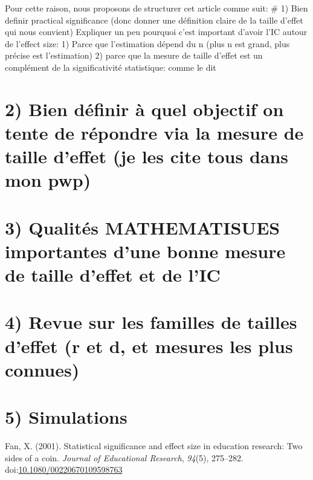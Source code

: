 \documentclass[man]{apa6}
\begin{document}
Pour cette raison, nous proposons de structurer cet article comme suit:
\# 1) Bien definir practical significance (donc donner une définition claire de la taille d'effet qui nous convient)
Expliquer un peu pourquoi c'est important d'avoir l'IC autour de l'effect size:
1) Parce que l'estimation dépend du n (plus n est grand, plus précise est l'estimation)
2) parce que la mesure de taille d'effet est un complément de la significativité statistique: comme le dit

\hypertarget{bien-duxe9finir-uxe0-quel-objectif-on-tente-de-ruxe9pondre-via-la-mesure-de-taille-deffet-je-les-cite-tous-dans-mon-pwp}{%
\section{2) Bien définir à quel objectif on tente de répondre via la mesure de taille d'effet (je les cite tous dans mon pwp)}\label{bien-duxe9finir-uxe0-quel-objectif-on-tente-de-ruxe9pondre-via-la-mesure-de-taille-deffet-je-les-cite-tous-dans-mon-pwp}}

\hypertarget{qualituxe9s-mathematisues-importantes-dune-bonne-mesure-de-taille-deffet-et-de-lic}{%
\section{3) Qualités MATHEMATISUES importantes d'une bonne mesure de taille d'effet et de l'IC}\label{qualituxe9s-mathematisues-importantes-dune-bonne-mesure-de-taille-deffet-et-de-lic}}

\hypertarget{revue-sur-les-familles-de-tailles-deffet-r-et-d-et-mesures-les-plus-connues}{%
\section{4) Revue sur les familles de tailles d'effet (r et d, et mesures les plus connues)}\label{revue-sur-les-familles-de-tailles-deffet-r-et-d-et-mesures-les-plus-connues}}

\hypertarget{simulations}{%
\section*{5) Simulations}\label{simulations}}

\hypertarget{refs}{}
\leavevmode\hypertarget{ref-Fan_2001}{}%
Fan, X. (2001). Statistical significance and effect size in education research: Two sides of a coin. \emph{Journal of Educational Research}, \emph{94}(5), 275--282. doi:\href{https://doi.org/10.1080/00220670109598763}{10.1080/00220670109598763}
\end{document}
